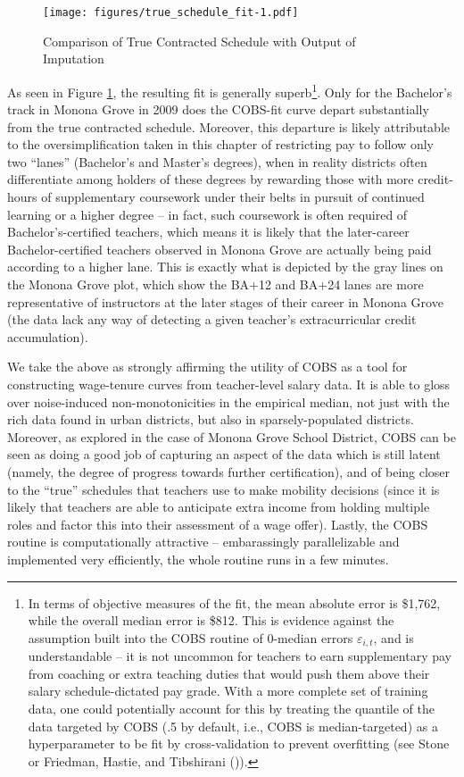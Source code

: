 \begin{figure}[htbp]
\centering
\texttt{[image: figures/true\_schedule\_fit-1.pdf]}
\caption{\label{fig:true_fit}Comparison of True Contracted Schedule with
Output of Imputation}
\end{figure}

As seen in Figure \ref{fig:true_fit}, the resulting fit is generally
superb\footnote{In terms of objective measures of the fit, the mean
  absolute error is \$1,762, while the overall median error is \$812.
  This is evidence against the assumption built into the COBS routine of
  0-median errors \(\varepsilon_{i, t}\), and is understandable -- it is
  not uncommon for teachers to earn supplementary pay from coaching or
  extra teaching duties that would push them above their salary
  schedule-dictated pay grade. With a more complete set of training
  data, one could potentially account for this by treating the quantile
  of the data targeted by COBS (.5 by default, i.e., COBS is
  median-targeted) as a hyperparameter to be fit by cross-validation to
  prevent overfitting (see Stone \citeyear{stone} or
  Friedman, Hastie, and Tibshirani
  (\citeyear{friedman})).}. Only for the Bachelor's
track in Monona Grove in 2009 does the COBS-fit curve depart
substantially from the true contracted schedule. Moreover, this
departure is likely attributable to the oversimplification taken in this
chapter of restricting pay to follow only two ``lanes'' (Bachelor's and
Master's degrees), when in reality districts often differentiate among
holders of these degrees by rewarding those with more credit-hours of
supplementary coursework under their belts in pursuit of continued
learning or a higher degree -- in fact, such coursework is often
required of Bachelor's-certified teachers, which means it is likely that
the later-career Bachelor-certified teachers observed in Monona Grove
are actually being paid according to a higher lane. This is exactly what
is depicted by the gray lines on the Monona Grove plot, which show the
BA+12 and BA+24 lanes are more representative of instructors at the
later stages of their career in Monona Grove (the data lack any way of
detecting a given teacher's extracurricular credit accumulation).

We take the above as strongly affirming the utility of COBS as a tool
for constructing wage-tenure curves from teacher-level salary data. It
is able to gloss over noise-induced non-monotonicities in the empirical
median, not just with the rich data found in urban districts, but also
in sparsely-populated districts. Moreover, as explored in the case of
Monona Grove School District, COBS can be seen as doing a good job of
capturing an aspect of the data which is still latent (namely, the
degree of progress towards further certification), and of being closer
to the ``true'' schedules that teachers use to make mobility decisions
(since it is likely that teachers are able to anticipate extra income
from holding multiple roles and factor this into their assessment of a
wage offer). Lastly, the COBS routine is computationally attractive --
embarassingly parallelizable and implemented very efficiently, the whole
routine runs in a few minutes.

